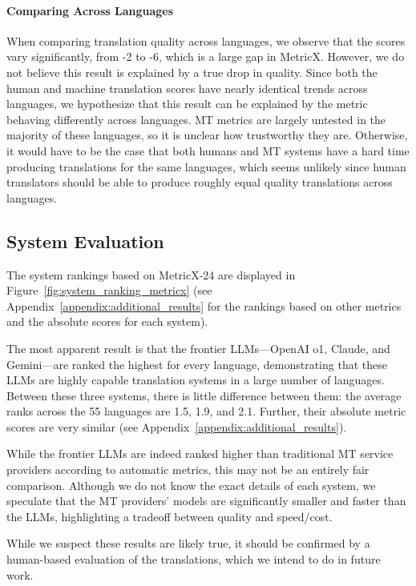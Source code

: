 \paragraph{Comparing Across Languages}
When comparing translation quality across languages, we observe that the scores vary significantly, from -2 to -6, which is a large gap in MetricX.
However, we do not believe this result is explained by a true drop in quality.
Since both the human and machine translation scores have nearly identical trends across languages, we hypothesize that this result can be explained by the metric behaving differently across languages.
MT metrics are largely untested in the majority of these languages, so it is unclear how trustworthy they are.
Otherwise, it would have to be the case that both humans and MT systems have a hard time producing translations for the same languages, which seems unlikely since human translators should be able to produce roughly equal quality translations across languages.


\subsection{System Evaluation}
The system rankings based on MetricX-24 are displayed in Figure~\ref{fig:system_ranking_metricx} (see Appendix~\ref{appendix:additional_results} for the rankings based on other metrics and the absolute scores for each system).




The most apparent result is that the frontier LLMs---OpenAI o1, Claude, and Gemini---are ranked the highest for every language, demonstrating that these LLMs are highly capable translation systems in a large number of languages.
Between these three systems, there is little difference between them: the average ranks across the 55 languages are 1.5, 1.9, and 2.1.
Further, their absolute metric scores are very similar (see Appendix~\ref{appendix:additional_results}).

While the frontier LLMs are indeed ranked higher than traditional MT service providers according to automatic metrics, this may not be an entirely fair comparison.
Although we do not know the exact details of each system, we speculate that the MT providers' models are significantly smaller and faster than the LLMs, highlighting a tradeoff between quality and speed/cost.

While we suspect these results are likely true, it should be confirmed by a human-based evaluation of the translations, which we intend to do in future work.


